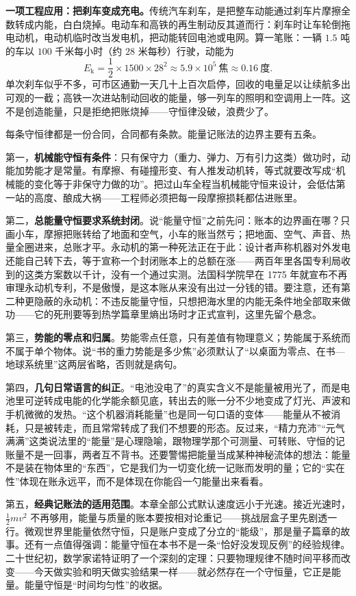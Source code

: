 \textbf{一项工程应用：把刹车变成充电。}传统汽车刹车，是把整车动能通过刹车片摩擦全数转成内能，白白烧掉。电动车和高铁的再生制动反其道而行：刹车时让车轮倒拖电动机，电动机临时改当发电机，把动能转回电池或电网。算一笔账：一辆 \(1.5\) 吨的车以 \(100\) 千米每小时（约 \(28\) 米每秒）行驶，动能为
\[
E_{\mathrm k}=\frac12\times1500\times28^{2}\approx 5.9\times10^{5}\ \text{焦}\approx 0.16\ \text{度} .
\]
单次刹车似乎不多，可市区通勤一天几十上百次启停，回收的电量足以让续航多出可观的一截；高铁一次进站制动回收的能量，够一列车的照明和空调用上一阵。这不是创造能量，只是拒绝把账烧掉——守恒律没破，浪费少了。


每条守恒律都是一份合同，合同都有条款。能量记账法的边界主要有五条。

第一，\textbf{机械能守恒有条件}：只有保守力（重力、弹力、万有引力这类）做功时，动能加势能才是常量。有摩擦、有碰撞形变、有人推发动机转，等式就要改写成“机械能的变化等于非保守力做的功”。把过山车全程当机械能守恒来设计，会低估第一站的高度、酿成大祸——工程师必须把每一段摩擦损耗都估进账里。

第二，\textbf{总能量守恒要求系统封闭}。说“能量守恒”之前先问：账本的边界画在哪？只画小车，摩擦把账转给了地面和空气，小车的账当然亏；把地面、空气、声音、热量全圈进来，总账才平。永动机的第一种死法正在于此：设计者声称机器对外发电还能自己转下去，等于宣称一个封闭账本上的总额在涨——两百年里各国专利局收到的这类方案数以千计，没有一个通过实测。法国科学院早在 1775 年就宣布不再审理永动机专利，不是傲慢，是这本账从来没有出过一分钱的错。要注意，还有第二种更隐蔽的永动机：不违反能量守恒，只想把海水里的内能无条件地全部取来做功——它的死刑要等到热学篇章里熵出场时才正式宣判，这里先留个悬念。

第三，\textbf{势能的零点和归属}。势能零点任意，只有差值有物理意义；势能属于系统而不属于单个物体。说“书的重力势能是多少焦”必须默认了“以桌面为零点、在书—地球系统里”这两层省略，否则就是病句。

第四，\textbf{几句日常语言的纠正}。“电池没电了”的真实含义不是能量被用光了，而是电池里可逆转成电能的化学能余额见底，转出去的账一分不少地变成了灯光、声波和手机微微的发热。“这个机器消耗能量”也是同一句口语的变体——能量从不被消耗，只是被转走，而且常常转成了我们不想要的形态。反过来，“精力充沛”“元气满满”这类说法里的“能量”是心理隐喻，跟物理学那个可测量、可转账、守恒的记账量不是一回事，两者互不背书。还要警惕把能量当成某种神秘流体的想法：能量不是装在物体里的“东西”，它是我们为一切变化统一记账而发明的量；它的“实在性”体现在账永远平，而不是体现在你能舀一勺能量出来看看。

第五，\textbf{经典记账法的适用范围}。本章全部公式默认速度远小于光速。接近光速时，\(\frac{1}{2}mv^2\) 不再够用，能量与质量的账本要按相对论重记——挑战层盒子里先剧透一行。微观世界里能量依然守恒，只是账户变成了分立的“能级”，那是量子篇章的故事。还有一点值得强调：能量守恒在本书不是一条“恰好没发现反例”的经验规律。 二十世纪初，数学家诺特证明了一个深刻的定理：只要物理规律不随时间平移而改变——今天做实验和明天做实验结果一样——就必然存在一个守恒量，它正是能量。能量守恒是“时间均匀性”的收据。

